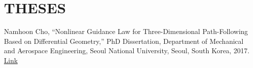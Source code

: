 \section{THESES}

Namhoon Cho, ``Nonlinear Guidance Law for Three-Dimensional Path-Following Based on Differential Geometry,'' PhD Dissertation, Department of Mechanical and Aerospace Engineering, Seoul National University, Seoul, South Korea, 2017. \n\href{}{Link}


